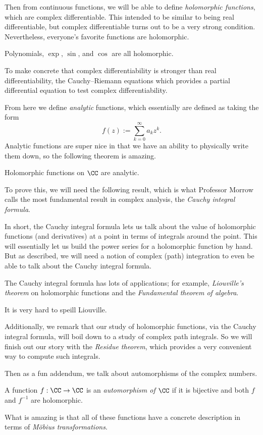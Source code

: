 Then from continuous functions, we will be able to define \textit{holomorphic functions}, which are complex differentiable. This intended to be similar to being real differentiable, but complex differentiable turns out to be a very strong condition. Nevertheless, everyone's favorite functions are holomorphic.
\begin{example}
	Polynomials, $\exp$, $\sin$, and $\cos$ are all holomorphic.
\end{example}
To make concrete that complex differentiability is stronger than real differentiability, the Cauchy--Riemann equations which provides a partial differential equation to test complex differentiability.

From here we define \textit{analytic} functions, which essentially are defined as taking the form
\[f(z):=\sum_{k=0}^\infty a_kz^k.\]
Analytic functions are super nice in that we have an ability to physically write them down, so the following theorem is amazing.
\begin{theorem}
	Holomorphic functions on $\CC$ are analytic.
\end{theorem}
To prove this, we will need the following result, which is what Professor Morrow calls the most fundamental result in complex analysis, the \textit{Cauchy integral formula}.

In short, the Cauchy integral formula lets us talk about the value of holomorphic functions (and derivatives) at a point in terms of integrals around the point. This will essentially let us build the power series for a holomorphic function by hand. But as described, we will need a notion of complex (path) integration to even be able to talk about the Cauchy integral formula.

The Cauchy integral formula has lots of applications; for example, \textit{Liouville's theorem} on holomorphic functions and the \textit{Fundamental theorem of algebra}.
\begin{remark}
	It is very hard to speill Liouville.
\end{remark}
Additionally, we remark that our study of holomorphic functions, via the Cauchy integral formula, will boil down to a study of complex path integrals. So we will finish out our story with the \textit{Residue theorem}, which provides a very convenient way to compute such integrals.

Then as a fun addendum, we talk about automorphisms of the complex numbers.
\begin{definition}
	A function $f:\CC\to\CC$ is an \textit{automorphism of $\CC$} if it is bijective and both $f$ and $f^{-1}$ are holomorphic.
\end{definition}
\noindent What is amazing is that all of these functions have a concrete description in terms of \textit{M\"obius transformations}.

